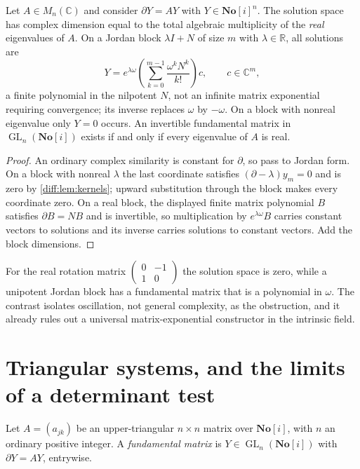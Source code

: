 \documentclass[11pt,letterpaper]{article}
\numberwithin{equation}{section}
\theoremstyle{definition}
\theoremstyle{remark}
\newcommand{\SC}{\mathbf{No}[i]}
\newcommand{\R}{\mathbb R}
\newcommand{\C}{\mathbb C}
\newcommand{\der}{\partial}
\newcommand{\GL}{\operatorname{GL}}
\begin{document}
\begin{corollary}
\label{diff:cor:matrix}
Let $A\in M_{n}(\C)$ and consider $\der Y=AY$ with $Y\in\SC^{n}$. The
solution space has complex dimension equal to the total algebraic multiplicity
of the \emph{real} eigenvalues of $A$. On a Jordan block $\lambda I+N$ of size
$m$ with $\lambda\in\R$, all solutions are
\begin{equation}\label{diff:eq:jordan}
 Y=e^{\lambda\omega}
 \left(\sum_{k=0}^{m-1}\frac{\omega^{k}N^{k}}{k!}\right)c,
 \qquad c\in\C^{m},
\end{equation}
a finite polynomial in the nilpotent $N$, not an infinite matrix exponential
requiring convergence; its inverse replaces $\omega$ by $-\omega$. On a block
with nonreal eigenvalue only $Y=0$ occurs. An invertible fundamental matrix in
$\GL_{n}(\SC)$ exists if and only if every eigenvalue of $A$ is real.
\end{corollary}
\begin{proof}
An ordinary complex similarity is constant for $\der$, so pass to Jordan form.
On a block with nonreal $\lambda$ the last coordinate satisfies
$(\der-\lambda)y_{m}=0$ and is zero by \cref{diff:lem:kernels}; upward
substitution through the block makes every coordinate zero. On a real block,
the displayed finite matrix polynomial $B$ satisfies $\der B=NB$ and is
invertible, so multiplication by $e^{\lambda\omega}B$ carries constant vectors
to solutions and its inverse carries solutions to constant vectors. Add the
block dimensions.
\end{proof}

For the real rotation matrix
$\left(\begin{smallmatrix}0&-1\\1&0\end{smallmatrix}\right)$ the solution space
is zero, while a unipotent Jordan block has a fundamental matrix that is a
polynomial in $\omega$. The contrast isolates oscillation, not general
complexity, as the obstruction, and it already rules out a universal
matrix-exponential constructor in the intrinsic field.

\section{Triangular systems, and the limits of a determinant test}
\label{diff:sec:triangular}

Let $A=(a_{jk})$ be an upper-triangular $n\times n$ matrix over $\SC$, with
$n$ an ordinary positive integer. A \emph{fundamental matrix} is
$Y\in\GL_{n}(\SC)$ with $\der Y=AY$, entrywise.
\end{document}
